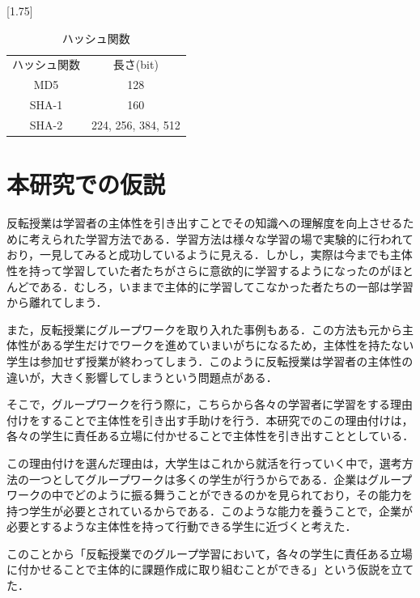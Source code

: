 \documentclass[a4j,11pt]{jsarticle}
\begin{document}
\begin{table}[htbp]
\begin{center}
\caption{ハッシュ関数}
\scalebox{1.75}[1.75]{
\begin{tabular}{|c|c|}
\cline{1-2}
 ハッシュ関数 & 長さ(bit) \\ \cline{1-2}  
MD5 & 128  \\ \cline{1-2}  
 SHA-1 &  160\\ \cline{1-2}  
 SHA-2 &  224, 256, 384, 512\\ \cline{1-2}  
\end{tabular}
}
\label{hash}
\end{center}
\end{table}

\newpage

\section{本研究での仮説}
反転授業は学習者の主体性を引き出すことでその知識への理解度を向上させるために考えられた学習方法である．学習方法は様々な学習の場で実験的に行われており，一見してみると成功しているように見える．しかし，実際は今までも主体性を持って学習していた者たちがさらに意欲的に学習するようになったのがほとんどである．むしろ，いままで主体的に学習してこなかった者たちの一部は学習から離れてしまう．

また，反転授業にグループワークを取り入れた事例もある．この方法も元から主体性がある学生だけでワークを進めていまいがちになるため，主体性を持たない学生は参加せず授業が終わってしまう．このように反転授業は学習者の主体性の違いが，大きく影響してしまうという問題点がある．

そこで，グループワークを行う際に，こちらから各々の学習者に学習をする理由付けをすることで主体性を引き出す手助けを行う．本研究でのこの理由付けは，各々の学生に責任ある立場に付かせることで主体性を引き出すこととしている．

この理由付けを選んだ理由は，大学生はこれから就活を行っていく中で，選考方法の一つとしてグループワークは多くの学生が行うからである．企業はグループワークの中でどのように振る舞うことができるのかを見られており，その能力を持つ学生が必要とされているからである．このような能力を養うことで，企業が必要とするような主体性を持って行動できる学生に近づくと考えた．

このことから「反転授業でのグループ学習において，各々の学生に責任ある立場に付かせることで主体的に課題作成に取り組むことができる」という仮説を立てた．

\newpage
\end{document}
